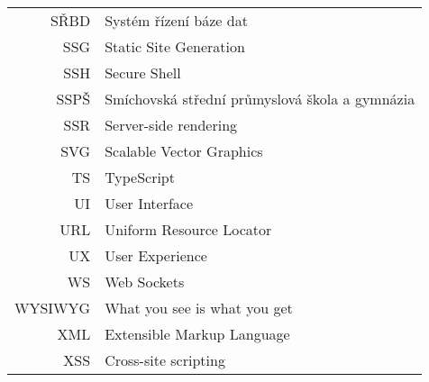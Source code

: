 \begin{longtable}{rl}
SŘBD & Systém řízení báze dat\\
SSG & Static Site Generation\\
SSH & Secure Shell\\
SSPŠ & Smíchovská střední průmyslová škola a gymnázia\\
SSR & Server-side rendering\\
SVG & Scalable Vector Graphics\\
TS & TypeScript\\
UI & User Interface\\
URL & Uniform Resource Locator\\
UX & User Experience\\
WS & Web Sockets\\
WYSIWYG & What you see is what you get\\
XML & Extensible Markup Language\\
XSS & Cross-site scripting
\end{longtable}